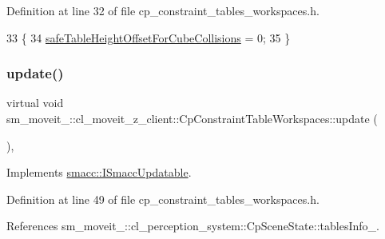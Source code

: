 Definition at line 32 of file cp\+\_\+constraint\+\_\+tables\+\_\+workspaces.\+h.


\begin{DoxyCode}
33             \{
34                  \hyperlink{classsm__moveit__4_1_1cl__moveit__z__client_1_1CpConstraintTableWorkspaces_a8c9bd78c8330ae1446e5bc4d2891e285}{safeTableHeightOffsetForCubeCollisions} = 0;
35             \}
\end{DoxyCode}
\mbox{\label{classsm__moveit__4_1_1cl__moveit__z__client_1_1CpConstraintTableWorkspaces_ae0b53f2cceedd97e053e66b1df2d9486}} 
\subsubsection{\texorpdfstring{update()}{update()}}
{\footnotesize\ttfamily virtual void sm\+\_\+moveit\+\_\+::cl\+\_\+moveit\+\_\+z\+\_\+client\+::\+Cp\+Constraint\+Table\+Workspaces\+::update (\begin{DoxyParamCaption}{ }\end{DoxyParamCaption})\hspace{0.3cm}{\ttfamily [inline]}, {\ttfamily [virtual]}}



Implements \hyperlink{classsmacc_1_1ISmaccUpdatable_a84ee0520cbefdb1d412bed54650b028e}{smacc\+::\+I\+Smacc\+Updatable}.



Definition at line 49 of file cp\+\_\+constraint\+\_\+tables\+\_\+workspaces.\+h.



References sm\+\_\+moveit\+\_\+::cl\+\_\+perception\+\_\+system\+::\+Cp\+Scene\+State\+::tables\+Info\+\_\+.


